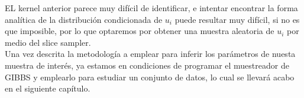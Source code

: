 EL kernel anterior parece muy difícil de identificar, e intentar encontrar la forma analítica de la distribución condicionada de $u_{i}$ puede resultar muy difícil, si no es que imposible, por lo que optaremos por obtener una muestra aleatoria de $u_{i}$ por medio del slice sampler.\\
Una vez descrita la metodología a emplear para inferir los parámetros de nuesta muestra de interés, ya estamos en condiciones de programar el muestreador de GIBBS y emplearlo para estudiar un conjunto de datos, lo cual se llevará acabo en el siguiente capítulo.

